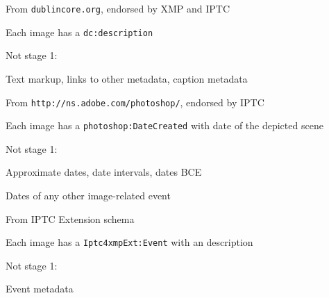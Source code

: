 \documentclass{article}
\newenvironment{slide*}[1][]{
	\def\inset{\leftmargin=0.5ex}
	\clearpage
	\ifthenelse{\isempty{#1}}{}{\vspace*{-0.75in}\begin{center}\raggedright{\bf #1\textcolor{none}{j}\hrule}\vspace{0.5ex}\end{center}}
	\def\nest{\begin{list}{$^{_\bullet}$ }{\inset\def\inset{\leftmargin=1.5ex}\itemindent=0ex}}
	\def\unnest{\end{list}}
}{
}
\newenvironment{slide}[1][]{
	\begin{slide*}[#1]\nest
}{
	\unnest\end{slide*}
}
\newlength\nsbase
\def\small{\fontsize{0.8333\nsbase}{\nsbase}\selectfont}
\def\scriptsize{\fontsize{0.6944\nsbase}{0.8333\nsbase}\selectfont}
\begin{document}
\begin{slide}[Caption]
\item From {\tt dublincore.org}, endorsed by XMP and IPTC
\item Each image has a {\scriptsize \tt dc:description}
\item Not stage 1:
    \nest
    \item Text markup, links to other metadata, caption metadata
    \unnest
\end{slide}

\begin{slide}[Date]
\item From {\tt http://ns.adobe.com/photoshop/}, endorsed by IPTC
\item Each image has a {\scriptsize \tt photoshop:DateCreated} with date of the depicted scene
\item Not stage 1:
    \nest
    \item Approximate dates, date intervals, dates BCE
    \item Dates of any other image-related event
    \unnest
\end{slide}

\begin{slide}[Event]
\item From IPTC Extension schema
\item Each image has a {\scriptsize \tt Iptc4xmpExt:Event} with an description
\item Not stage 1:
    \nest
    \item Event metadata
    \unnest
\end{slide}
\end{document}
